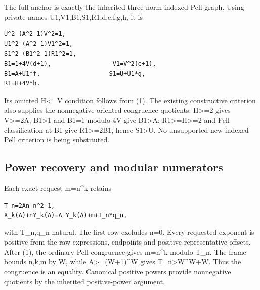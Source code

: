 The full anchor is exactly the inherited three-norm indexed-Pell graph. Using private names U1,V1,B1,S1,R1,d,e,f,g,h, it is



\begin{verbatim}
U^2-(A^2-1)V^2=1,
U1^2-(A^2-1)V1^2=1,
S1^2-(B1^2-1)R1^2=1,
B1=1+4V(d+1),                 V1=V^2(e+1),
B1=A+U1*f,                   S1=U+U1*g,
R1=H+4V*h.
\end{verbatim}

Its omitted H\textless{}\allowbreak{}=\allowbreak{}V condition follows from (1). The existing constructive criterion also supplies the nonnegative oriented congruence quotients: H\textgreater{}\allowbreak{}=\allowbreak{}2 gives V\textgreater{}\allowbreak{}=\allowbreak{}2A; B1\textgreater{}\allowbreak{}1 and B1=\allowbreak{}1 modulo 4V give B1\textgreater{}\allowbreak{}A; R1\textgreater{}\allowbreak{}=\allowbreak{}H\textgreater{}\allowbreak{}=\allowbreak{}2 and Pell classification at B1 give R1\textgreater{}\allowbreak{}=\allowbreak{}2B1, hence S1\textgreater{}\allowbreak{}U. No unsupported new indexed-Pell criterion is being substituted.



\subsection{Power recovery and modular numerators}



Each exact request m=\allowbreak{}n\textasciicircum{}\allowbreak{}k retains



\begin{verbatim}
T_n=2An-n^2-1,
X_k(A)+nY_k(A)=A Y_k(A)+m+T_n*q_n,
\end{verbatim}

with T\_\allowbreak{}n,q\_\allowbreak{}n natural. The first row excludes n=\allowbreak{}0. Every requested exponent is positive from the raw expressions, endpoints and positive representative offsets. After (1), the ordinary Pell congruence gives m=\allowbreak{}n\textasciicircum{}\allowbreak{}k modulo T\_\allowbreak{}n. The frame bounds n,k,m by W, while A\textgreater{}\allowbreak{}=\allowbreak{}(W+\allowbreak{}1)\textasciicircum{}\allowbreak{}W gives T\_\allowbreak{}n\textgreater{}\allowbreak{}W\textasciicircum{}\allowbreak{}W+\allowbreak{}W. Thus the congruence is an equality. Canonical positive powers provide nonnegative quotients by the inherited positive-power argument.



